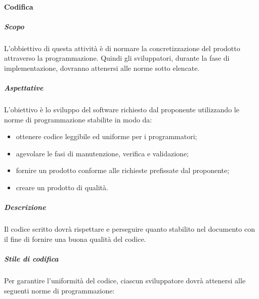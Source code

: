 			\paragraph{Codifica}
				\subparagraph{Scopo}
					L'obbiettivo di questa attività è di normare la concretizzazione del prodotto attraverso la programmazione. Quindi gli sviluppatori, durante la fase di implementazione, dovranno attenersi alle norme sotto elencate.
				\subparagraph{Aspettative}
					 L’obiettivo è lo sviluppo del software richiesto dal proponente utilizzando le norme di programmazione stabilite in modo da:
					 	\begin{itemize}
					 	\item ottenere codice leggibile ed uniforme per i programmatori;
						\item agevolare le fasi di manutenzione, verifica e validazione;
						\item fornire un prodotto conforme alle richieste prefissate dal proponente;
						\item creare un prodotto di qualità.
					 \end{itemize}
				 \subparagraph{Descrizione}
				 	Il codice scritto dovrà rispettare e perseguire quanto stabilito nel documento  con il fine di fornire una buona qualità del codice.
				 \subparagraph{Stile di codifica}
				 	Per garantire l'uniformità del codice, ciascun sviluppatore dovrà attenersi alle seguenti norme di programmazione:
